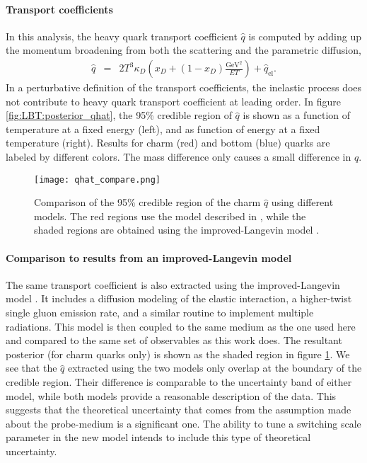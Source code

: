 \paragraph{Transport coefficients} In this analysis, the heavy quark transport coefficient $\hat{q}$ is computed by adding up the momentum broadening from both the scattering and the parametric diffusion,
\begin{eqnarray}\label{eq:qhat}
\hat{q} &=& 2T^3\kappa_D\left(x_D + (1-x_D)\frac{\textrm{GeV}^2}{ET}\right) + \hat{q}_{\textrm{el}}.
\end{eqnarray}
In a perturbative definition of the transport coefficients, the inelastic process does not contribute to heavy quark transport coefficient at leading order. 
In figure \ref{fig:LBT:posterior_qhat}, the 95\% credible region of $\hat{q}$ is shown as a function of temperature at a fixed energy (left), and as function of energy at a fixed temperature (right).
Results for charm (red) and bottom (blue) quarks are labeled by different colors.
The mass difference only causes a small difference in $\hat{q}$.

\begin{figure}
\singlespacing
\centering
\texttt{[image: qhat\_compare.png]}
\caption[Comparison of the 95\% credible region of the charm $\hat{q}$ using]{Comparison of the 95\% credible region of the charm $\hat{q}$ using different models. The red regions use the model described in \cite{Ke:2018tsh}, while the  shaded regions are obtained using  the improved-Langevin model \cite{Cao:2013ita}.}\label{fig:LBT:compare_qhat}
\end{figure}

\paragraph{Comparison to results from an improved-Langevin model}
The same transport coefficient is also extracted using the improved-Langevin model \cite{Cao:2013ita}.
It includes a diffusion modeling of the elastic interaction, a higher-twist single gluon emission rate, and a similar routine to implement multiple radiations.
This model is then coupled to the same medium as the one used here and compared to the same set of observables as this work does.
The resultant posterior (for charm quarks only) is shown as the shaded region in figure \ref{fig:LBT:compare_qhat}.
We see that the $\hat{q}$ extracted using the two models only overlap at the boundary of the credible region.
Their difference is comparable to the uncertainty band of either model, while both models provide a reasonable description of the data.
This suggests that the theoretical uncertainty that comes from the assumption made about the probe-medium is a significant one.
The ability to tune a switching scale parameter in the new model intends to include this type of theoretical uncertainty.

